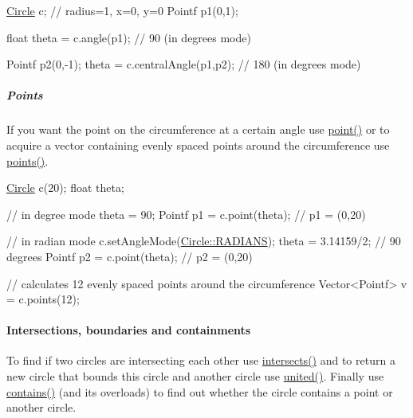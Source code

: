 \begin{DoxyCode}
\hyperlink{classprism_1_1_circle_aff41793f64e90d15a4d89851b1a6b011}{Circle} c; \textcolor{comment}{// radius=1, x=0, y=0}
Pointf p1(0,1);

\textcolor{keywordtype}{float} theta = c.angle(p1); \textcolor{comment}{// 90 (in degrees mode)}

Pointf p2(0,-1);
theta = c.centralAngle(p1,p2); \textcolor{comment}{// 180 (in degrees mode)}
\end{DoxyCode}


\subparagraph*{Points}

If you want the point on the circumference at a certain angle use \hyperlink{classprism_1_1_circle_a42e70e1d37414bf4c22500b80b168c9d}{point()} or to acquire a vector containing evenly spaced points around the circumference use \hyperlink{classprism_1_1_circle_ad6916936a346137cdf93227edfb1cbaf}{points()}.


\begin{DoxyCode}
\hyperlink{classprism_1_1_circle_aff41793f64e90d15a4d89851b1a6b011}{Circle} c(20);
\textcolor{keywordtype}{float} theta;

\textcolor{comment}{// in degree mode}
theta = 90;
Pointf p1 = c.point(theta); \textcolor{comment}{// p1 = (0,20)}

\textcolor{comment}{// in radian mode}
c.setAngleMode(\hyperlink{classprism_1_1_circle_a74c7c532b4eb120b9227b7fabeffe6aca4e738ac91c0d446d1cd6c0ee11a7baaf}{Circle::RADIANS});
theta = 3.14159/2; \textcolor{comment}{// 90 degrees}
Pointf p2 = c.point(theta); \textcolor{comment}{// p2 = (0,20)}

\textcolor{comment}{// calculates 12 evenly spaced points around the circumference}
Vector<Pointf> v = c.points(12);
\end{DoxyCode}


\paragraph*{Intersections, boundaries and containments}

To find if two circles are intersecting each other use \hyperlink{classprism_1_1_circle_a2c9d9c17e0e094eac55f74398986b940}{intersects()} and to return a new circle that bounds this circle and another circle use \hyperlink{classprism_1_1_circle_a8e34ff5188e91cfe080264e106909f6e}{united()}. Finally use \hyperlink{classprism_1_1_circle_aafcedb559b7bbba00cfd84fab7378801}{contains()} (and its overloads) to find out whether the circle contains a point or another circle.

